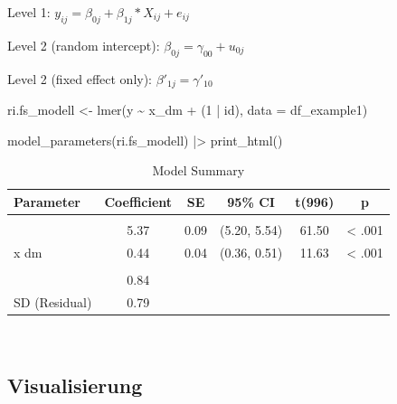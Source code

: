 \documentclass[
  letterpaper,
  DIV=11,
  numbers=noendperiod]{scrreprt}
\newenvironment{Shaded}{\begin{snugshade}}{\end{snugshade}}
\newcommand{\AttributeTok}[1]{\textcolor[rgb]{0.40,0.45,0.13}{#1}}
\newcommand{\DecValTok}[1]{\textcolor[rgb]{0.68,0.00,0.00}{#1}}
\newcommand{\FunctionTok}[1]{\textcolor[rgb]{0.28,0.35,0.67}{#1}}
\newcommand{\NormalTok}[1]{\textcolor[rgb]{0.00,0.23,0.31}{#1}}
\newcommand{\OtherTok}[1]{\textcolor[rgb]{0.00,0.23,0.31}{#1}}
\newcommand{\SpecialCharTok}[1]{\textcolor[rgb]{0.37,0.37,0.37}{#1}}
\begin{document}
Level 1: \(y_{ij} = \beta_{0j} + \beta_{1j}*X_{ij} + e_{ij}\)

Level 2 (random intercept): \(\beta_{0j} = \gamma_{00} + u_{0j}\)

Level 2 (fixed effect only): \(\beta'_{1j} = \gamma'_{10}\)

\begin{Shaded}
\begin{Highlighting}[]
\NormalTok{ri.fs\_modell }\OtherTok{\textless{}{-}} \FunctionTok{lmer}\NormalTok{(y }\SpecialCharTok{\textasciitilde{}}\NormalTok{ x\_dm }\SpecialCharTok{+}\NormalTok{ (}\DecValTok{1} \SpecialCharTok{|}\NormalTok{ id), }\AttributeTok{data =}\NormalTok{ df\_example1)}
\end{Highlighting}
\end{Shaded}

\begin{Shaded}
\begin{Highlighting}[]
\FunctionTok{model\_parameters}\NormalTok{(ri.fs\_modell) }\SpecialCharTok{|\textgreater{}} \FunctionTok{print\_html}\NormalTok{()}
\end{Highlighting}
\end{Shaded}

\begin{table}
\caption*{
{\large Model Summary}
} 
\fontsize{12.0pt}{14.4pt}\selectfont
\begin{tabular*}{\linewidth}{@{\extracolsep{\fill}}lccccc}
\toprule
Parameter & Coefficient & SE & 95\% CI & t(996) & p \\ 
\midrule\addlinespace[2.5pt]
\multicolumn{6}{l}{{\slshape Fixed Effects }} \\[2.5pt] 
\midrule\addlinespace[2.5pt]
{(Intercept)} & 5.37 & 0.09 & (5.20, 5.54) & 61.50 & < .001 \\ 
{x dm} & 0.44 & 0.04 & (0.36, 0.51) & 11.63 & < .001 \\ 
\midrule\addlinespace[2.5pt]
\multicolumn{6}{l}{{\slshape Random Effects }} \\[2.5pt] 
\midrule\addlinespace[2.5pt]
{SD (Intercept: id)} & 0.84 &  &  &  &  \\ 
{SD (Residual)} & 0.79 &  &  &  &  \\ 
\bottomrule
\end{tabular*}
\begin{minipage}{\linewidth}
\\
\end{minipage}
\end{table}

\subsection{Visualisierung}\label{visualisierung-1}
\end{document}
